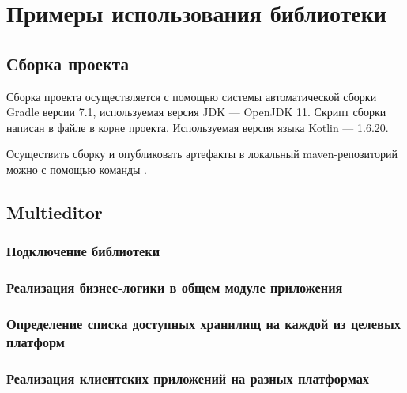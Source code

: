 \section{Примеры использования библиотеки}

\subsection{Сборка проекта}
    Сборка проекта осуществляется с помощью системы автоматической сборки Gradle\cite{gradle} версии 7.1, используемая версия JDK --- OpenJDK 11. Скрипт сборки написан в файле  в корне проекта. Используемая версия языка Kotlin --- 1.6.20.

    Осуществить сборку и опубликовать артефакты в локальный maven-репозиторий можно с помощью команды .

\subsection{Multieditor}
    \subsubsection{Подключение библиотеки}

    \subsubsection{Реализация бизнес-логики в общем модуле приложения}
    \subsubsection{Определение списка доступных хранилищ на каждой из целевых платформ}
    \subsubsection{Реализация клиентских приложений на разных платформах}
        \paragraph{}
